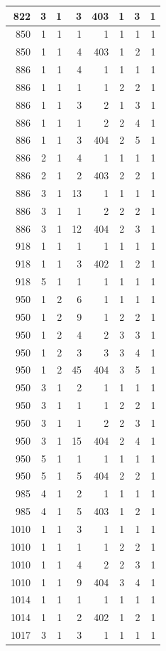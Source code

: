 \documentclass[11pt,]{book}
\begin{document}
\begin{table}
\begin{tabular}[t]{r|r|r|r|r|r|r|r}
\hline
822 & 3 & 1 & 3 & 403 & 1 & 3 & 1\\
\hline
850 & 1 & 1 & 1 & 1 & 1 & 1 & 1\\
\hline
850 & 1 & 1 & 4 & 403 & 1 & 2 & 1\\
\hline
886 & 1 & 1 & 4 & 1 & 1 & 1 & 1\\
\hline
886 & 1 & 1 & 1 & 1 & 2 & 2 & 1\\
\hline
886 & 1 & 1 & 3 & 2 & 1 & 3 & 1\\
\hline
886 & 1 & 1 & 1 & 2 & 2 & 4 & 1\\
\hline
886 & 1 & 1 & 3 & 404 & 2 & 5 & 1\\
\hline
886 & 2 & 1 & 4 & 1 & 1 & 1 & 1\\
\hline
886 & 2 & 1 & 2 & 403 & 2 & 2 & 1\\
\hline
886 & 3 & 1 & 13 & 1 & 1 & 1 & 1\\
\hline
886 & 3 & 1 & 1 & 2 & 2 & 2 & 1\\
\hline
886 & 3 & 1 & 12 & 404 & 2 & 3 & 1\\
\hline
918 & 1 & 1 & 1 & 1 & 1 & 1 & 1\\
\hline
918 & 1 & 1 & 3 & 402 & 1 & 2 & 1\\
\hline
918 & 5 & 1 & 1 & 1 & 1 & 1 & 1\\
\hline
950 & 1 & 2 & 6 & 1 & 1 & 1 & 1\\
\hline
950 & 1 & 2 & 9 & 1 & 2 & 2 & 1\\
\hline
950 & 1 & 2 & 4 & 2 & 3 & 3 & 1\\
\hline
950 & 1 & 2 & 3 & 3 & 3 & 4 & 1\\
\hline
950 & 1 & 2 & 45 & 404 & 3 & 5 & 1\\
\hline
950 & 3 & 1 & 2 & 1 & 1 & 1 & 1\\
\hline
950 & 3 & 1 & 1 & 1 & 2 & 2 & 1\\
\hline
950 & 3 & 1 & 1 & 2 & 2 & 3 & 1\\
\hline
950 & 3 & 1 & 15 & 404 & 2 & 4 & 1\\
\hline
950 & 5 & 1 & 1 & 1 & 1 & 1 & 1\\
\hline
950 & 5 & 1 & 5 & 404 & 2 & 2 & 1\\
\hline
985 & 4 & 1 & 2 & 1 & 1 & 1 & 1\\
\hline
985 & 4 & 1 & 5 & 403 & 1 & 2 & 1\\
\hline
1010 & 1 & 1 & 3 & 1 & 1 & 1 & 1\\
\hline
1010 & 1 & 1 & 1 & 1 & 2 & 2 & 1\\
\hline
1010 & 1 & 1 & 4 & 2 & 2 & 3 & 1\\
\hline
1010 & 1 & 1 & 9 & 404 & 3 & 4 & 1\\
\hline
1014 & 1 & 1 & 1 & 1 & 1 & 1 & 1\\
\hline
1014 & 1 & 1 & 2 & 402 & 1 & 2 & 1\\
\hline
1017 & 3 & 1 & 3 & 1 & 1 & 1 & 1\\
\hline
\end{tabular}
\end{table}
\end{document}
